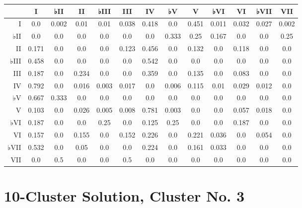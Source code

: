\begin{table}[htbp]
\begin{minipage}{\linewidth}
\setlength{\tymax}{0.5\linewidth}
\centering
\small
\begin{tabulary}{\textwidth}{@{}RCCCCCCCCCCCC@{}} \toprule
&I&♭II&II&♭III&III&IV&♭V&V&♭VI&VI&♭VII&VII\\
\midrule
I&0.0&0.002&0.01&0.01&0.038&0.418&0.0&0.451&0.011&0.032&0.027&0.002\\
♭II&0.0&0.0&0.0&0.0&0.0&0.0&0.333&0.25&0.167&0.0&0.0&0.25\\
II&0.171&0.0&0.0&0.0&0.123&0.456&0.0&0.132&0.0&0.118&0.0&0.0\\
♭III&0.458&0.0&0.0&0.0&0.0&0.542&0.0&0.0&0.0&0.0&0.0&0.0\\
III&0.187&0.0&0.234&0.0&0.0&0.359&0.0&0.135&0.0&0.083&0.0&0.0\\
IV&0.792&0.0&0.016&0.003&0.017&0.0&0.006&0.115&0.01&0.029&0.012&0.0\\
♭V&0.667&0.333&0.0&0.0&0.0&0.0&0.0&0.0&0.0&0.0&0.0&0.0\\
V&0.103&0.0&0.026&0.005&0.008&0.781&0.003&0.0&0.0&0.057&0.018&0.0\\
♭VI&0.187&0.0&0.0&0.25&0.0&0.125&0.25&0.0&0.0&0.187&0.0&0.0\\
VI&0.157&0.0&0.155&0.0&0.152&0.226&0.0&0.221&0.036&0.0&0.054&0.0\\
♭VII&0.532&0.0&0.05&0.0&0.0&0.224&0.0&0.161&0.033&0.0&0.0&0.0\\
VII&0.0&0.5&0.0&0.0&0.5&0.0&0.0&0.0&0.0&0.0&0.0&0.0\\

\bottomrule

\end{tabulary}
\end{minipage}
\end{table}

\section{10-Cluster Solution, Cluster No. 3}
\label{10-clustersolutionclusterno.3}

